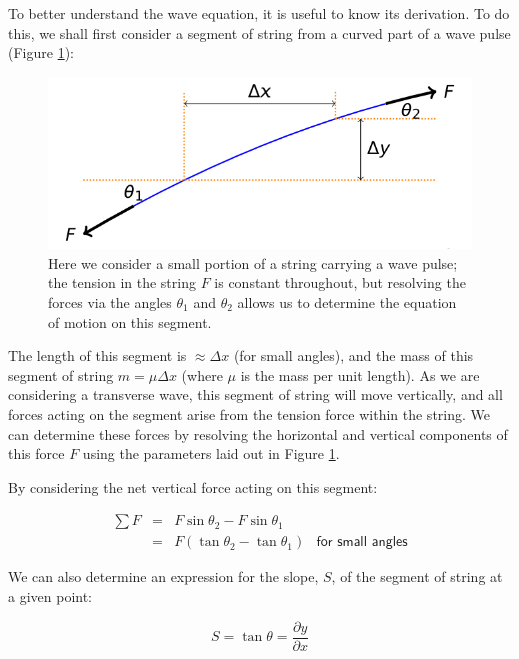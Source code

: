 \documentclass[
]{book}
\begin{document}
To better understand the wave equation, it is useful to know its derivation. To do this, we shall first consider a segment of string from a curved part of a wave pulse (Figure \ref{fig:ch6-waveeqnderiv1}):

\begin{figure}

{\centering \includegraphics[width=0.7\linewidth]{visualisations/LaTeX/ch6-waveequationderiv1} 

}

\caption{Here we consider a small portion of a string carrying a wave pulse; the tension in the string $F$ is constant throughout, but resolving the forces via the angles $\theta_1$ and $\theta_2$ allows us to determine the equation of motion on this segment. }\label{fig:ch6-waveeqnderiv1}
\end{figure}

The length of this segment is \(\approx \Delta x\) (for small angles), and the mass of this segment of string \(m = \mu \Delta x\) (where \(\mu\) is the mass per unit length). As we are considering a transverse wave, this segment of string will move vertically, and all forces acting on the segment arise from the tension force within the string. We can determine these forces by resolving the horizontal and vertical components of this force \(F\) using the parameters laid out in Figure \ref{fig:ch6-waveeqnderiv1}.

By considering the net vertical force acting on this segment:

\begin{equation}
\begin{array}{rcll}
\sum F &=& F \sin \theta_2 - F \sin \theta_1 &\\
&=& F \left( \tan \theta_2 - \tan \theta_1 \right) & \textsf{for small angles}
\end{array}
\label{eq:ch6-waveeqnderiv1}
\end{equation}

We can also determine an expression for the slope, \(S\), of the segment of string at a given point:

\begin{equation}
S = \tan \theta = \frac{\partial y}{\partial x}
\label{eq:ch6-waveeqnderiv2}
\end{equation}
\end{document}
